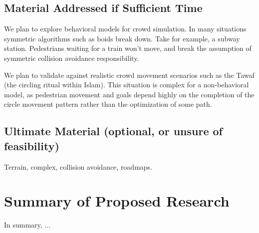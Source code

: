 \documentclass[cameraready]{acmsiggraph}  %
\begin{document}
\subsection{Material Addressed if Sufficient Time}
We plan to explore behavioral models for crowd simulation.  In many situations symmetric algorithms such as boids break down. Take for example, a subway station. Pedestrians waiting for a train won't move, and break the assumption of symmetric collision avoidance responsibility. 

We plan to validate against realistic crowd movement scenarios such as the Tawaf (the circling ritual within Islam).  This situation is complex for a non-behavioral model, as pedestrian movement and goals depend highly on the completion of the circle movement pattern rather than the optimization of some path. \cite{curtispedestrian}



\subsection{Ultimate Material (optional, or unsure of feasibility)} 

Terrain, complex, collision avoidance, roadmaps.

\section{Summary of Proposed Research}

In summary, ...




\end{document}

